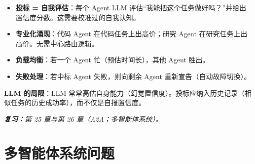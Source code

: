 \begin{questionbox}
\begin{itemize}
  \item \textbf{投标 = 自我评估}：每个 Agent LLM 评估“我能把这个任务做好吗？”并给出置信度分数。这需要校准过的自我认知。
  \item \textbf{专业化涌现}：代码 Agent 在代码任务上出高价；研究 Agent 在研究任务上出高价。无需中心路由逻辑。
  \item \textbf{负载均衡}：若一个 Agent 忙（预估时间长），其他 Agent 胜出。
  \item \textbf{失败处理}：若中标 Agent 失败，则向剩余 Agent 重新宣告（自动故障切换）。
\end{itemize}

\textbf{LLM 的局限}：LLM 常常高估自身能力（幻觉置信度）。投标应纳入历史记录（相似任务的历史成功率），而不仅是自报置信度。

\emph{\textbf{复习：}第 25 章与第 26 章（A2A；多智能体系统）。}
\end{questionbox}

\section{多智能体系统问题}
\label{multi-agent-systems-questions}

